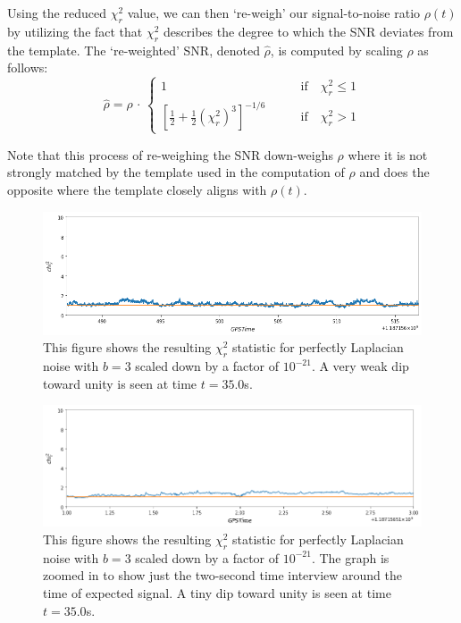 \documentclass[preprint,
letterpaper,
 amsmath,amssymb,
 aps,
]{revtex4-2}
\begin{document}
Using the reduced $\chi_r^2$ value, we can then `re-weigh' our signal-to-noise ratio $\rho(t)$ by utilizing the fact that $\chi_r^2$ describes the degree to which the SNR deviates from the template. The `re-weighted' SNR, denoted $\hat{\rho}$, is computed by scaling $\rho$ as follows:
\begin{equation}
    \hat{\rho} = \rho \,\cdot \,
    \begin{cases}
    1     & \quad\quad\text{if}\quad \chi^2_r\leq1\\
     \left[\frac{1}{2} + \frac{1}{2}(\chi^2_r)^3\right]^{-1/6}   & \quad\quad\text{if}\quad \chi^2_r>1
    \end{cases}
\end{equation}

Note that this process of re-weighing the SNR down-weighs $\rho$ where it is not strongly matched by the template used in the computation of $\rho$ and does the opposite where the template closely aligns with $\rho(t)$.

\begin{figure}[t]
\includegraphics[width = .9\textwidth]{chi2 laplace b=3 zoomed.png}
\caption{This figure shows the resulting $\chi^2_r$ statistic for perfectly Laplacian noise with $b=3$ scaled down by a factor of $10^{-21}$. A very weak dip toward unity is seen at time $t = 35.0$s.}
\centering
\end{figure} 

\begin{figure}[t]
\includegraphics[width = .9\textwidth]{chi2 laplace b=3.png}
\caption{This figure shows the resulting $\chi^2_r$ statistic for perfectly Laplacian noise with $b=3$ scaled down by a factor of $10^{-21}$. The graph is zoomed in to show just the two-second time interview around the time of expected signal. A tiny dip toward unity is seen at time $t = 35.0$s.}
\centering
\end{figure} 
\end{document}
